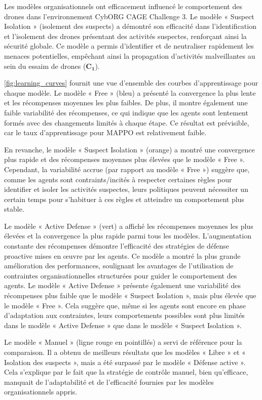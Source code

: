 Les modèles organisationnels ont efficacement influencé le comportement des drones dans l'environnement CybORG CAGE Challenge 3. Le modèle « Suspect Isolation » (isolement des suspects) a démontré son efficacité dans l'identification et l'isolement des drones présentant des activités suspectes, renforçant ainsi la sécurité globale. Ce modèle a permis d'identifier et de neutraliser rapidement les menaces potentielles, empêchant ainsi la propagation d'activités malveillantes au sein du essaim de drones ($\mathbf{C_1}$).

\autoref{fig:learning_curves} fournit une vue d'ensemble des courbes d'apprentissage pour chaque modèle. Le modèle « Free » (bleu) a présenté la convergence la plus lente et les récompenses moyennes les plus faibles. De plus, il montre également une faible variabilité des récompenses, ce qui indique que les agents sont lentement formés avec des changements limités à chaque étape. Ce résultat est prévisible, car le taux d'apprentissage pour MAPPO est relativement faible.

En revanche, le modèle « Suspect Isolation » (orange) a montré une convergence plus rapide et des récompenses moyennes plus élevées que le modèle « Free ». Cependant, la variabilité accrue (par rapport au modèle « Free ») suggère que, comme les agents sont contraints/incités à respecter certaines règles pour identifier et isoler les activités suspectes, leurs politiques peuvent nécessiter un certain temps pour s'habituer à ces règles et atteindre un comportement plus stable.

Le modèle « Active Defense » (vert) a affiché les récompenses moyennes les plus élevées et la convergence la plus rapide parmi tous les modèles. L'augmentation constante des récompenses démontre l'efficacité des stratégies de défense proactive mises en œuvre par les agents. Ce modèle a montré la plus grande amélioration des performances, soulignant les avantages de l'utilisation de contraintes organisationnelles structurées pour guider le comportement des agents. Le modèle « Active Defense » présente également une variabilité des récompenses plus faible que le modèle « Suspect Isolation », mais plus élevée que le modèle « Free ». Cela suggère que, même si les agents sont encore en phase d'adaptation aux contraintes, leurs comportements possibles sont plus limités dans le modèle « Active Defense » que dans le modèle « Suspect Isolation ».

Le modèle « Manuel » (ligne rouge en pointillés) a servi de référence pour la comparaison. Il a obtenu de meilleurs résultats que les modèles « Libre » et « Isolation des suspects », mais a été surpassé par le modèle « Défense active ». Cela s'explique par le fait que la stratégie de contrôle manuel, bien qu'efficace, manquait de l'adaptabilité et de l'efficacité fournies par les modèles organisationnels appris.

